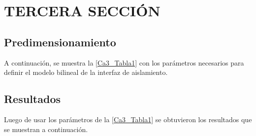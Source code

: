 \section{TERCERA SECCIÓN}

\lipsum[10]
	
	\subsection{Predimensionamiento}

A continuación, se muestra la \autoref{Ca3_Tabla1} con los parámetros necesarios para definir el modelo bilineal de la interfaz de aislamiento.


	\subsection{Resultados} \label{subsection:Resul}

\lipsum[11]

Luego de usar los parámetros de la \autoref{Ca3_Tabla1} se obtuvieron los resultados que se muestran a continuación.
	

		
